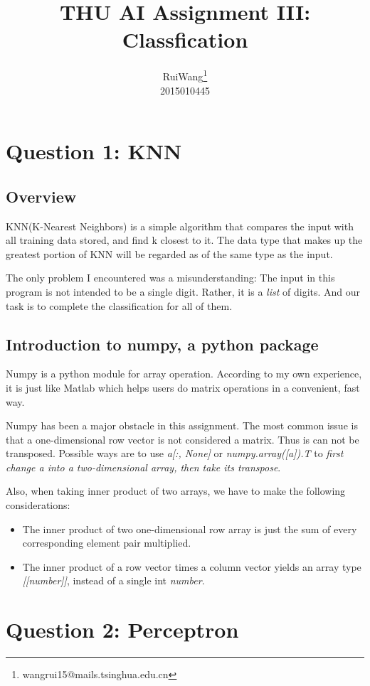 \documentclass{article}
\title{THU AI Assignment III: Classfication}
\author{\large Rui\hspace{0.2cm}Wang\footnote{wangrui15@mails.tsinghua.edu.cn} \\ 2015010445}
\date{}
\begin{document}
\maketitle
\section{Question 1: KNN}
\subsection{Overview}
KNN(K-Nearest Neighbors) is a simple algorithm that compares the input with all training data stored, and find k closest to it. The data type that makes up the greatest portion of KNN will be regarded as of the same type as the input.\par
The only problem I encountered was a misunderstanding: The input in this program is not intended to be a single digit. Rather, it is a \textit{list} of digits. And our task is to complete the classification for all of them.
\subsection{Introduction to numpy, a python package}
Numpy is a python module for array operation. According to my own experience, it is just like Matlab which helps users do matrix operations in a convenient, fast way.\par
Numpy has been a major obstacle in this assignment. The most common issue is that a one-dimensional row vector is not considered a matrix. Thus is can not be transposed. Possible ways are to use \textit{a[:, None]} or \textit{numpy.array([a]).T} to \emph{first change \textit{a} into a two-dimensional array, then take its transpose}.\par
Also, when taking inner product of two arrays, we have to make the following considerations:
\begin{itemize}
  \item The inner product of two one-dimensional row array is just the sum of every corresponding element pair multiplied.
  \item The inner product of a row vector times a column vector yields an array type \textit{[[number]]}, instead of a single int \textit{number}.
\end{itemize}

\section{Question 2: Perceptron}
\end{document}
